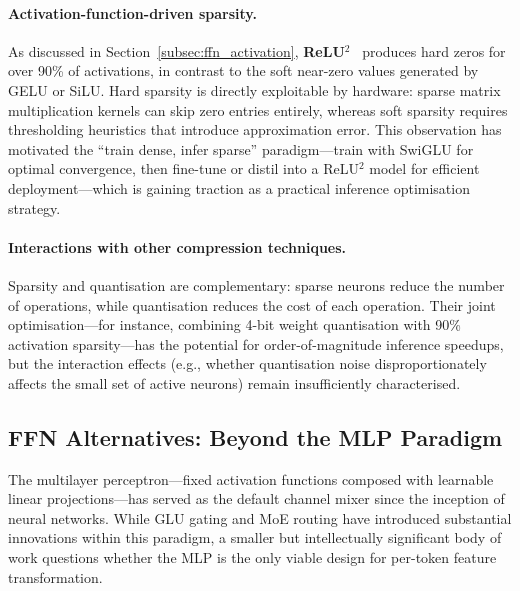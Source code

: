 \paragraph{Activation-function-driven sparsity.}
As discussed in Section~\ref{subsec:ffn_activation}, \textbf{ReLU$^2$}~\cite{zhang2024relu2} produces hard zeros for over 90\% of activations, in contrast to the soft near-zero values generated by GELU or SiLU.
Hard sparsity is directly exploitable by hardware: sparse matrix multiplication kernels can skip zero entries entirely, whereas soft sparsity requires thresholding heuristics that introduce approximation error.
This observation has motivated the ``train dense, infer sparse'' paradigm---train with SwiGLU for optimal convergence, then fine-tune or distil into a ReLU$^2$ model for efficient deployment---which is gaining traction as a practical inference optimisation strategy.

\paragraph{Interactions with other compression techniques.}
Sparsity and quantisation are complementary: sparse neurons reduce the number of operations, while quantisation reduces the cost of each operation.
Their joint optimisation---for instance, combining 4-bit weight quantisation with 90\% activation sparsity---has the potential for order-of-magnitude inference speedups, but the interaction effects (e.g., whether quantisation noise disproportionately affects the small set of active neurons) remain insufficiently characterised.


\subsection{FFN Alternatives: Beyond the MLP Paradigm}
\label{subsec:ffn_alternatives}

The multilayer perceptron---fixed activation functions composed with learnable linear projections---has served as the default channel mixer since the inception of neural networks.
While GLU gating and MoE routing have introduced substantial innovations within this paradigm, a smaller but intellectually significant body of work questions whether the MLP is the only viable design for per-token feature transformation.

